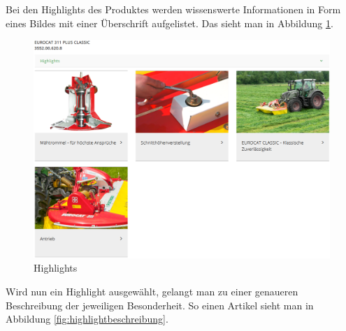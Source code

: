 Bei den Highlights des Produktes werden wissenswerte Informationen in Form eines Bildes mit einer Überschrift aufgelistet. Das sieht man in Abbildung \ref{fig:highlight}.
\begin{figure}[H]
	\centerline{
		\includegraphics[width=1\textwidth, frame]{./grafiken/erm_detailansicht_highlights.PNG}
	}
	\vskip0pt
	\caption{Highlights} \label{fig:highlight}
\end{figure}
 Wird nun ein Highlight ausgewählt, gelangt man zu einer genaueren Beschreibung der jeweiligen Besonderheit. So einen Artikel sieht man in Abbildung \ref{fig:highlightbeschreibung}.
